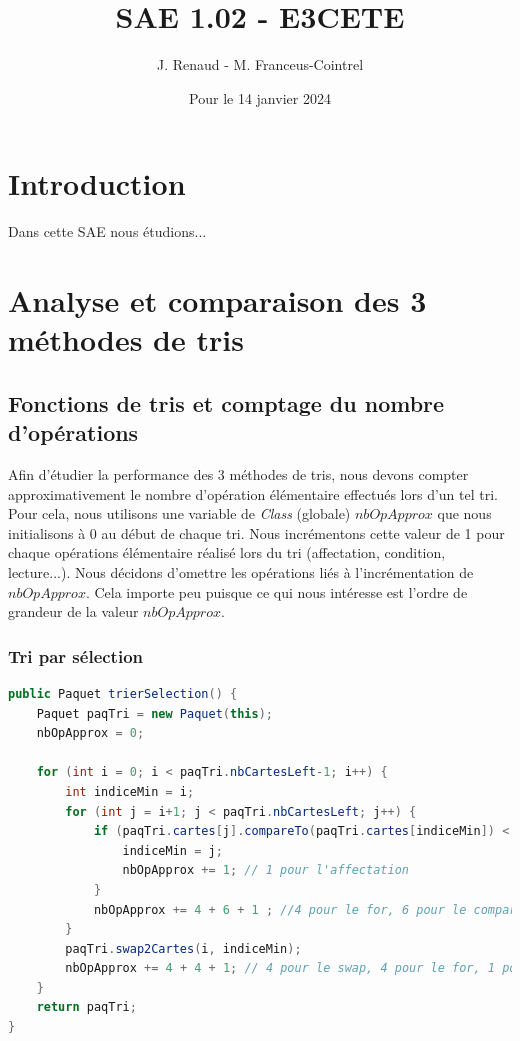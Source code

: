 \documentclass{report}
\title{\textbf{SAE 1.02 - E3CETE}}
\author{J. Renaud - M. Franceus-Cointrel}
\date{Pour le 14 janvier 2024}
\begin{document}
\maketitle
\tableofcontents

\chapter*{Introduction}

\qquad Dans cette SAE nous étudions...




\chapter{Analyse et comparaison des 3 méthodes de tris}

\qquad 

\section{Fonctions de tris et comptage du nombre d'opérations}

\qquad Afin d'étudier la performance des 3 méthodes de tris, nous devons compter approximativement le nombre d'opération élémentaire effectués lors d'un tel tri. Pour cela, nous utilisons une variable de \textit{Class} (globale) $nbOpApprox$ que nous initialisons à 0 au début de chaque tri. Nous incrémentons cette valeur de 1 pour chaque opérations élémentaire réalisé lors du tri (affectation, condition, lecture...). Nous décidons d'omettre les opérations liés à l'incrémentation de $nbOpApprox$. Cela importe peu puisque ce qui nous intéresse est l'ordre de grandeur de la valeur $nbOpApprox$.

\subsection{Tri par sélection}

\begin{lstlisting}[language=java, caption={\it Fonction tri sélection}, label=codeSEL]
public Paquet trierSelection() {
    Paquet paqTri = new Paquet(this);
    nbOpApprox = 0;

    for (int i = 0; i < paqTri.nbCartesLeft-1; i++) {
        int indiceMin = i;
        for (int j = i+1; j < paqTri.nbCartesLeft; j++) {
            if (paqTri.cartes[j].compareTo(paqTri.cartes[indiceMin]) < 0) {
                indiceMin = j;
                nbOpApprox += 1; // 1 pour l'affectation
            }
            nbOpApprox += 4 + 6 + 1 ; //4 pour le for, 6 pour le compareTo, 1 pour le if
        }
        paqTri.swap2Cartes(i, indiceMin);
        nbOpApprox += 4 + 4 + 1; // 4 pour le swap, 4 pour le for, 1 pour l'affectation
    }
    return paqTri;
}
\end{lstlisting}
\end{document}
